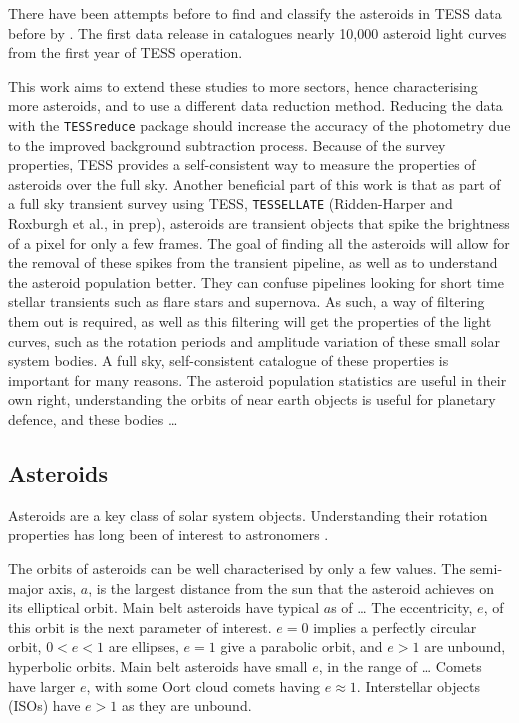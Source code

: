\documentclass[12pt]{article}
\begin{document}
There have been attempts before to find and classify the asteroids in TESS data before by \citet{Pal2018, Pal2020}.
The first data release in \citet{Pal2020} catalogues nearly 10,000 asteroid light curves from the first year of TESS operation.

This work aims to extend these studies to more sectors, hence characterising more asteroids, and to use a different data reduction method.
Reducing the data with the \texttt{TESSreduce} package \citep{Ridden-Harper2021} should increase the accuracy of the photometry due to the improved background subtraction process.
Because of the survey properties, TESS provides a self-consistent way to measure the properties of asteroids over the full sky.
Another beneficial part of this work is that as part of a full sky transient survey using TESS, \texttt{TESSELLATE} (Ridden-Harper and Roxburgh et al., in prep), asteroids are transient objects that spike the brightness of a pixel for only a few frames.
The goal of finding all the asteroids will allow for the removal of these spikes from the transient pipeline, as well as to understand the asteroid population better.
They can confuse pipelines looking for short time stellar transients such as flare stars and supernova.
As such, a way of filtering them out is required, as well as this filtering will get the properties of the light curves, such as the rotation periods and amplitude variation of these small solar system bodies.
A full sky, self-consistent catalogue of these properties is important for many reasons.
The asteroid population statistics are useful in their own right, understanding the orbits of near earth objects is useful for planetary defence, and these bodies \dots






\subsection{Asteroids}\label{SubSec:Asteroid}

Asteroids are a key class of solar system objects.
Understanding their rotation properties has long been of interest to astronomers \citep[e.g.][]{Weidenschilling1981,Harris1994}.

The orbits of asteroids can be well characterised by only a few values. The semi-major axis, $a$, is the largest distance from the sun that the asteroid achieves on its elliptical orbit.
Main belt asteroids have typical $a$s of \dots %
The eccentricity, $e$, of this orbit is the next parameter of interest. $e=0$ implies a perfectly circular orbit, $0<e<1$ are ellipses, $e=1$ give a parabolic orbit, and $e>1$ are unbound, hyperbolic orbits.
Main belt asteroids have small $e$, in the range of \dots
Comets have larger $e$, with some Oort cloud comets having $e\approx 1$.
Interstellar objects (ISOs) have $e>1$ as they are unbound.
\end{document}
